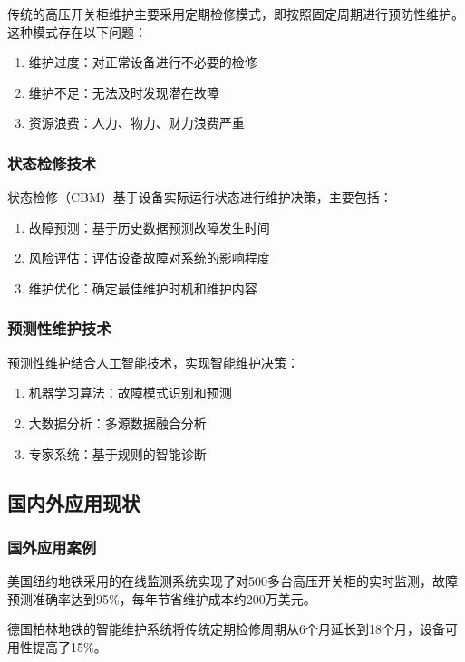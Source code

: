 传统的高压开关柜维护主要采用定期检修模式，即按照固定周期进行预防性维护。这种模式存在以下问题：
\begin{enumerate}
    \item 维护过度：对正常设备进行不必要的检修
    \item 维护不足：无法及时发现潜在故障
    \item 资源浪费：人力、物力、财力浪费严重
\end{enumerate}

\subsubsection{状态检修技术}

状态检修（CBM）基于设备实际运行状态进行维护决策，主要包括：
\begin{enumerate}
    \item 故障预测：基于历史数据预测故障发生时间
    \item 风险评估：评估设备故障对系统的影响程度
    \item 维护优化：确定最佳维护时机和维护内容
\end{enumerate}

\subsubsection{预测性维护技术}

预测性维护结合人工智能技术，实现智能维护决策：
\begin{enumerate}
    \item 机器学习算法：故障模式识别和预测
    \item 大数据分析：多源数据融合分析
    \item 专家系统：基于规则的智能诊断
\end{enumerate}

\subsection{国内外应用现状}

\subsubsection{国外应用案例}

美国纽约地铁采用的在线监测系统实现了对500多台高压开关柜的实时监测，故障预测准确率达到95\%，每年节省维护成本约200万美元。

德国柏林地铁的智能维护系统将传统定期检修周期从6个月延长到18个月，设备可用性提高了15\%。

